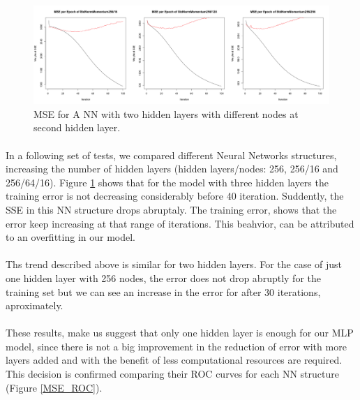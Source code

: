 \documentclass[11.5pt]{article}
\newcounter{Figure}
\newcounter{graphics}
\begin{document}
\begin{figure}[h!]
\includegraphics[width=1\textwidth]{report_mlp/256-16_128_256.png}
  \caption{\small MSE for A NN with two hidden layers with different nodes at second hidden layer.}
\label{256-16_128_256.png}
\end{figure}

\paragraph{} In  a following set of tests, we compared different Neural Networks structures, increasing the number of hidden layers (hidden layers/nodes: 256, 256/16 and 256/64/16).  Figure \ref{256-16_128_256.png} shows that for the model with three hidden layers the training error is not decreasing considerably before 40 iteration. Suddently, the SSE in this NN structure drops abruptaly. The training error, shows that the error keep increasing at that range of iterations. This beahvior, can be attributed to an overfitting in our model. 

\paragraph{} Ths trend described above is similar for two hidden layers. For the case of just one hidden layer with 256 nodes, the error does not drop abruptly for the training set but we can see an increase in the error for after 30 iterations, aproximately.

\paragraph{} These results, make us suggest that only one hidden layer is enough for our MLP model, since there is not a big improvement in the reduction of error with more layers added and with the benefit of less computational resources are required.
This decision is confirmed comparing their ROC curves for each NN structure  (Figure \ref{MSE_ROC}).
 
\end{document}
